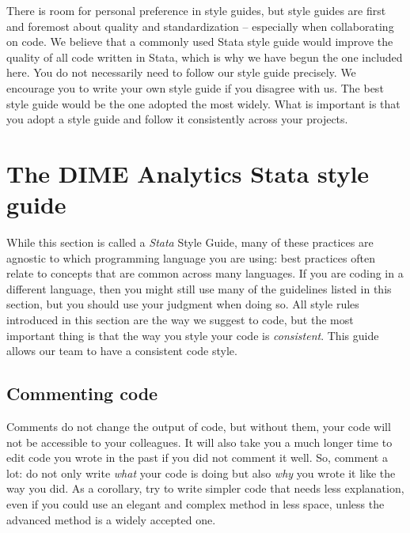There is room for personal preference in style guides,
but style guides are first and foremost about quality and standardization --
especially when collaborating on code.
We believe that a commonly used Stata style guide would improve the quality of all code written in Stata,
which is why we have begun the one included here.
You do not necessarily need to follow our style guide precisely.
We encourage you to write your own style guide if you disagree with us.
The best style guide would be the one adopted the most widely.
What is important is that you adopt a style guide and follow it consistently across your projects.

\newpage

\section{The DIME Analytics Stata style guide}

While this section is called a \textit{Stata} Style Guide,
many of these practices are agnostic to which programming language you are using:
best practices often relate to concepts that are common across many languages.
If you are coding in a different language,
then you might still use many of the guidelines listed in this section,
but you should use your judgment when doing so.
All style rules introduced in this section are the way we suggest to code,
but the most important thing is that the way you style your code is \textit{consistent}.
This guide allows our team to have a consistent code style.

\subsection{Commenting code}

Comments do not change the output of code, but without them,
your code will not be accessible to your colleagues.
It will also take you a much longer time to edit code you wrote in the past if you did not comment it well.
So, comment a lot: do not only write \textit{what} your code is doing
but also \textit{why} you wrote it like the way you did.
As a corollary, try to write simpler code that needs less explanation,
even if you could use an elegant and complex method in less space,
unless the advanced method is a widely accepted one.

